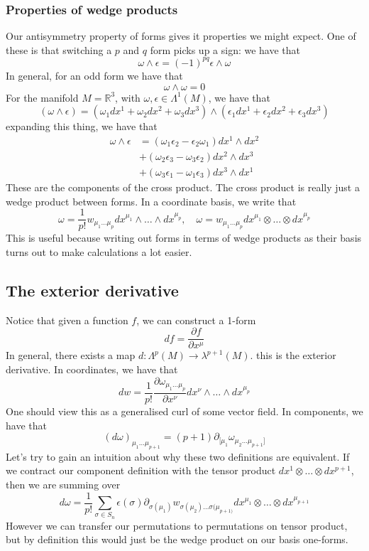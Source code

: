 \documentclass[11pt, a4paper]{article}   	%
\theoremstyle{slplain}
\begin{document}
\subsubsection{Properties of wedge products} 
Our antisymmetry property of forms 
gives it properties we might expect. 
One of these is that switching a $ p $ and $ q $ form 
picks up a sign:  we have that 
\[
\omega \wedge \epsilon  = ( - 1) ^{ p q } \epsilon \wedge  \omega    
\] In general, for an odd form we have that 
\[
\omega  \wedge  \omega = 0 
\] For the manifold $ M = \mathbb{ R} ^ 3 $, with $ \omega  , \epsilon \in \Lambda^ 1 ( M) $, 
we have that 
\[
( \omega  \wedge  \epsilon ) = ( \omega_1 dx^1 + \omega_2 dx^ 2 + \omega_3 dx^ 3 ) \wedge  ( \epsilon_1 dx^1 + \epsilon_2 dx^2 + \epsilon_3 dx^3 ) 
\] expanding this thing, we have that 
\begin{align*}
\omega  \wedge  \epsilon & = ( \omega_1 \epsilon_2  - \epsilon_2 \omega_1 ) dx^1 \wedge  dx^ 2 \\
			 & + ( \omega_2\epsilon_3 - \omega_3 \epsilon_2 ) dx^ 2 \wedge  dx^ 3 \\
			 & + ( \omega_3\epsilon_1  -\omega_1 \epsilon_3 ) dx^3 \wedge  dx^1 
\end{align*}
These are the components of the cross product. The cross product 
is really just a wedge product between forms. 
In a coordinate basis, we write that 
\[
\omega  = \frac{1}{p ! } w_{ \mu_1 \dots \mu_{ p }} dx^{ \mu_1 } \wedge  \dots \wedge  dx^{ \mu_{ p }}, \quad \omega =  w_{ \mu_ 1 \dots \mu_{ p  } } dx^{ \mu_ 1 } \otimes \dots \otimes dx^{ \mu_{ p } }  
\] This is useful because writing out forms in terms of wedge 
products as their basis turns out to make calculations a lot easier. 

\subsection{The exterior derivative} 
Notice that given a function $ f$, we can construct a  1-form 
\[
df = \frac{\partial f }{\partial  x^{ \mu} } 
\] In general, there exists a map 
$ d : \Lambda^ p ( M ) \to \lambda^{ p + 1 } (  M ) $. 
this is the exterior derivative. In coordinates, 
we have that 
\[
dw = \frac{1}{ p ! } \frac{\partial \omega_{ \mu_1 \dots \mu_{ p  } }}{\partial x^\nu} dx^\nu \wedge  \dots \wedge  dx^{ \mu_{ p }} 
\] One should view this as a 
generalised curl of some vector field. 
In components, we have that 
\[
( d \omega  ) _{ \mu_1 \dots \mu_{ p + 1  }} = ( p +  1) \partial_{ [ \mu_1 } \omega_{ \mu_2 \dots \mu_{ p + 1 }]  }
\] Let's try to gain an intuition about 
why these two definitions are equivalent.
If we contract our component definition with the tensor 
product $ dx^ 1 \otimes \dots \otimes dx^{p +1}$, 
then we are summing over 
\[
	d \omega = \frac{1}{p ! } \sum_{ \sigma \in S_ n } \epsilon ( \sigma)  \partial_{ \sigma ( \mu_ 1 ) } w_{ \sigma ( \mu _ 2 )  \dots \sigma ( \mu _{ p + 1 ) }} dx^{ \mu _ 1 } \otimes \dots \otimes dx^{ \mu _{ p +1}}
\] However we can transfer our 
permutations to permutations on tensor product, 
but by definition this would just be the 
wedge product on our basis one-forms. 
\end{document}
